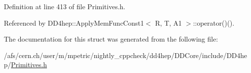 Definition at line 413 of file Primitives.h.

Referenced by DD4hep::ApplyMemFuncConst1$<$ R, T, A1 $>$::operator()().

The documentation for this struct was generated from the following file:\begin{DoxyCompactItemize}
\item 
/afs/cern.ch/user/m/mpetric/nightly\_\-cppcheck/dd4hep/DDCore/include/DD4hep/\hyperlink{_primitives_8h}{Primitives.h}\end{DoxyCompactItemize}
